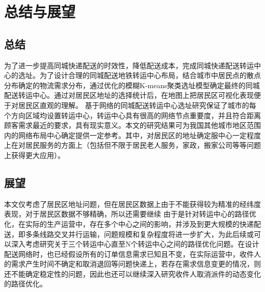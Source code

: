 \clearpage
\section{总结与展望}
\subsection{总结}
为了进一步提高同城快递配送的时效性，降低配送成本，完成同城快递配送转运中心的选址。为了设计合理的同城配送地铁转运中心布局，结合城市中居民点的散点分布确定的物流需求分布，通过优化的模糊K-means聚类选址模型确定最终的同城配送转运中心。通过对居民区地址的选择统计后，在地图上把居民区可视化表现便于对居民区直观的理解。
基于网络的同城配送转运中心选址研究保证了城市的每个方向区域均设置转运中心，转运中心具有很高的网络节点重要度，并且符合距离顾客需求最近的要求，具有现实意义。本文的研究结果可为我国其他城市地区范围内的网络布局中心确定提供一定参考。其中，对居民区的地址确定服中心一定程度上在对居民服务的方面上（包括但不限于居民老人服务，家政，搬家公司等等问题上获得更大应用）。

\subsection{展望}
本文仅考虑了居民区地址问题，但在居民区数据上由于不能获得较为精准的经纬度表现，对于居民区数据不够精确，所以还需要继续
由于是针对转运中心的路径优化，在实际的生产运营中，存在多个中心之间的影响，并涉及到更大规模的快递配送，即多条线路交叉并行运输，问题规模和复杂程度将进一步扩大，为此后续或可以深入考虑研究关于三个转运中心直至N个转运中心之间的路径优化问题。在设计配送网络时，也已经假设所有的订单信息需求已知且不变，在实际运营中，收件人的需求产生时间不确定和取消退回等问题快递上，若存在需求信息变更的情况，则还不能确定稳定性的问题，因此也还可以继续深入研究收件人取消派件的动态变化的路径优化。 







